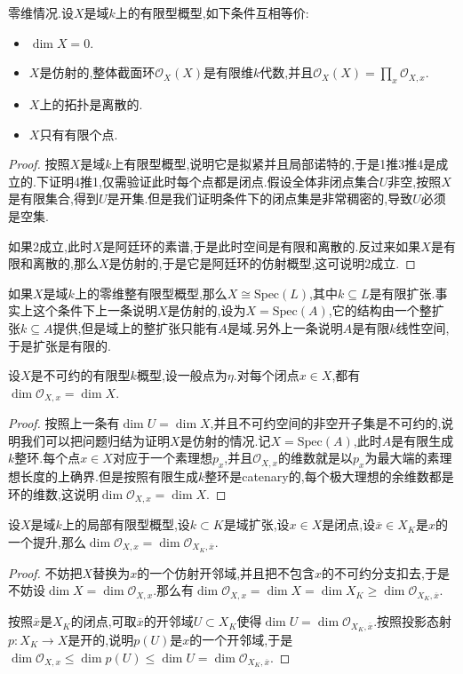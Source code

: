 \item 零维情况.设$X$是域$k$上的有限型概型,如下条件互相等价:
\begin{itemize}[(1)]
	\item $\dim X=0$.
	\item $X$是仿射的,整体截面环$\mathscr{O}_X(X)$是有限维$k$代数,并且$\mathscr{O}_X(X)=\prod_x\mathscr{O}_{X,x}$.
	\item $X$上的拓扑是离散的.
	\item $X$只有有限个点.
\end{itemize}
\begin{proof}
	
	按照$X$是域$k$上有限型概型,说明它是拟紧并且局部诺特的,于是1推3推4是成立的.下证明4推1,仅需验证此时每个点都是闭点.假设全体非闭点集合$U$非空,按照$X$是有限集合,得到$U$是开集.但是我们证明条件下的闭点集是非常稠密的,导致$U$必须是空集.
	
	如果2成立,此时$X$是阿廷环的素谱,于是此时空间是有限和离散的.反过来如果$X$是有限和离散的,那么$X$是仿射的,于是它是阿廷环的仿射概型,这可说明2成立.
\end{proof}
\item 如果$X$是域$k$上的零维整有限型概型,那么$X\cong\mathrm{Spec}(L)$,其中$k\subseteq L$是有限扩张.事实上这个条件下上一条说明$X$是仿射的,设为$X=\mathrm{Spec}(A)$,它的结构由一个整扩张$k\subseteq A$提供,但是域上的整扩张只能有$A$是域.另外上一条说明$A$是有限$k$线性空间,于是扩张是有限的.
\item 设$X$是不可约的有限型$k$概型,设一般点为$\eta$.对每个闭点$x\in X$,都有$\dim\mathscr{O}_{X,x}=\dim X$.
\begin{proof}
	
	按照上一条有$\dim U=\dim X$,并且不可约空间的非空开子集是不可约的,说明我们可以把问题归结为证明$X$是仿射的情况.记$X=\mathrm{Spec}(A)$,此时$A$是有限生成$k$整环.每个点$x\in X$对应于一个素理想$p_x$,并且$\mathscr{O}_{X,x}$的维数就是以$p_x$为最大端的素理想长度的上确界.但是按照有限生成$k$整环是catenary的,每个极大理想的余维数都是环的维数,这说明$\dim\mathscr{O}_{X,x}=\dim X$.
\end{proof}
\item 设$X$是域$k$上的局部有限型概型,设$k\subset K$是域扩张,设$x\in X$是闭点,设$\overline{x}\in X_K$是$x$的一个提升,那么$\dim\mathscr{O}_{X,x}=\dim\mathscr{O}_{X_K,\overline{x}}$.
\begin{proof}
	
	不妨把$X$替换为$x$的一个仿射开邻域,并且把不包含$x$的不可约分支扣去,于是不妨设$\dim X=\dim\mathscr{O}_{X,x}$.那么有$\dim\mathscr{O}_{X,x}=\dim X=\dim X_K\ge\dim\mathscr{O}_{X_K,\overline{x}}$.
	
	按照$\overline{x}$是$X_K$的闭点,可取$\overline{x}$的开邻域$U\subset X_K$使得$\dim U=\dim\mathscr{O}_{X_K,\overline{x}}$.按照投影态射$p:X_K\to X$是开的,说明$p(U)$是$x$的一个开邻域,于是$\dim\mathscr{O}_{X,x}\le\dim p(U)\le\dim U=\dim\mathscr{O}_{X_K,\overline{x}}$.
\end{proof}

